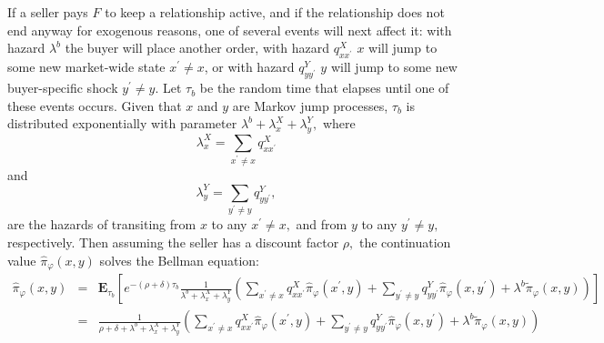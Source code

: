 \documentclass[12pt,titlepage]{article}
\begin{document}
\setcounter{footnote}{0}

If a seller pays $F$ to keep a relationship active, and if the relationship
does not end anyway for exogenous reasons, one of several events will next
affect it: with hazard $\lambda ^{b}$ the buyer will place another order,
with hazard $q_{xx^{\prime }}^{X}$ $x$ will jump to some new market-wide
state $x^{\prime }\neq x$, or with hazard $q_{yy^{\prime }}^{Y}$ $y$ will
jump to some new buyer-specific shock $y^{\prime }\neq y$.\footnotemark{} Let $\tau _{b}$ be
the random time that elapses until one of these events occurs. Given that $x$
and $y$ are Markov jump processes, $\tau _{b}$ is distributed exponentially
with parameter $\lambda ^{b}+\lambda _{x}^{X}+\lambda _{y}^{Y}, $ where%
\begin{equation}
\lambda _{x}^{X}=\sum_{x^{\prime }\neq x}q_{xx^{\prime }}^{X}  \label{q_K}
\end{equation}%
and%
\begin{equation}
\lambda _{y}^{Y}=\sum_{y^{\prime }\neq y}q_{yy^{\prime }}^{Y},  \label{q_Y}
\end{equation}%
are the hazards of transiting from $x$ to any $x^{\prime }\neq x,$ and from $%
y$ to any $y^{\prime }\neq y,$ respectively. Then assuming the seller has a
discount factor $\rho ,$ the continuation value $\widehat{\pi }_{\varphi
}(x,y)$ solves the Bellman equation:%
\begin{eqnarray*}
\widehat{\pi }_{\varphi }(x,y) &=&\mathbf{E}_{\tau _{b}}\left[ e^{-(\rho
+\delta )\tau _{b}}\frac{1}{\lambda ^{b}+\lambda _{x}^{X}+\lambda _{y}^{Y}}%
\left( \sum_{x^{\prime }\neq x}q_{xx^{\prime }}^{X}\widehat{\pi }_{\varphi
}(x^{\prime },y)+\sum_{y^{\prime }\neq y}q_{yy^{\prime }}^{Y}\widehat{\pi }%
_{\varphi }(x,y^{\prime })+\lambda ^{b}\widetilde{\pi }_{\varphi
}(x,y)\right) \right] \\
&=&\frac{1}{\rho +\delta +\lambda ^{b}+\lambda _{x}^{X}+\lambda _{y}^{Y}}%
\left( \sum_{x^{\prime }\neq x}q_{xx^{\prime }}^{X}\widehat{\pi }_{\varphi
}(x^{\prime },y)+\sum_{y^{\prime }\neq y}q_{yy^{\prime }}^{Y}\widehat{\pi }%
_{\varphi }(x,y^{\prime })+\lambda ^{b}\widetilde{\pi }_{\varphi
}(x,y)\right)
\end{eqnarray*}
\end{document}
